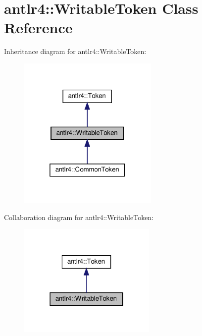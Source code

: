 \hypertarget{classantlr4_1_1WritableToken}{}\section{antlr4\+:\+:Writable\+Token Class Reference}
\label{classantlr4_1_1WritableToken}


Inheritance diagram for antlr4\+:\+:Writable\+Token\+:
\nopagebreak
\begin{figure}[H]
\begin{center}
\leavevmode
\includegraphics[width=193pt]{classantlr4_1_1WritableToken__inherit__graph}
\end{center}
\end{figure}


Collaboration diagram for antlr4\+:\+:Writable\+Token\+:
\nopagebreak
\begin{figure}[H]
\begin{center}
\leavevmode
\includegraphics[width=190pt]{classantlr4_1_1WritableToken__coll__graph}
\end{center}
\end{figure}
